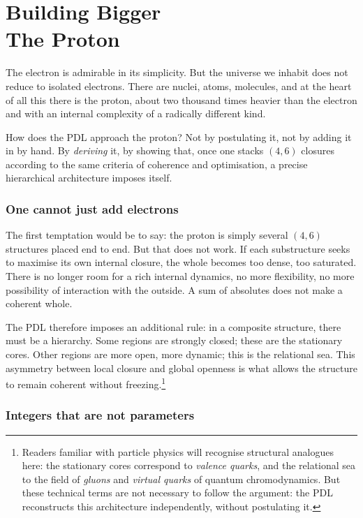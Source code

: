 \documentclass[12pt, a4paper, openright]{book}
\begin{document}
\chapter[Building Bigger --- The Proton]{Building Bigger \\ The Proton}

The electron is admirable in its simplicity. But the universe we inhabit does not reduce to isolated electrons. There are nuclei, atoms, molecules, and at the heart of all this there is the proton, about two thousand times heavier than the electron and with an internal complexity of a radically different kind.

\medskip

How does the PDL approach the proton? Not by postulating it, not by adding it in by hand. By \emph{deriving} it, by showing that, once one stacks $(4,6)$ closures according to the same criteria of coherence and optimisation, a precise hierarchical architecture imposes itself.

\subsection*{One cannot just add electrons}

The first temptation would be to say: the proton is simply several $(4,6)$ structures placed end to end. But that does not work. If each substructure seeks to maximise its own internal closure, the whole becomes too dense, too saturated. There is no longer room for a rich internal dynamics, no more flexibility, no more possibility of interaction with the outside. A sum of absolutes does not make a coherent whole.

\medskip

The PDL therefore imposes an additional rule: in a composite structure, there must be a hierarchy. Some regions are strongly closed; these are the stationary cores. Other regions are more open, more dynamic; this is the relational sea. This asymmetry between local closure and global openness is what allows the structure to remain coherent without freezing.\footnote{Readers familiar with particle physics will recognise structural analogues here: the stationary cores correspond to \emph{valence quarks}, and the relational sea to the field of \emph{gluons} and \emph{virtual quarks} of quantum chromodynamics. But these technical terms are not necessary to follow the argument: the PDL reconstructs this architecture independently, without postulating it.}

\subsection*{Integers that are not parameters}
\end{document}
